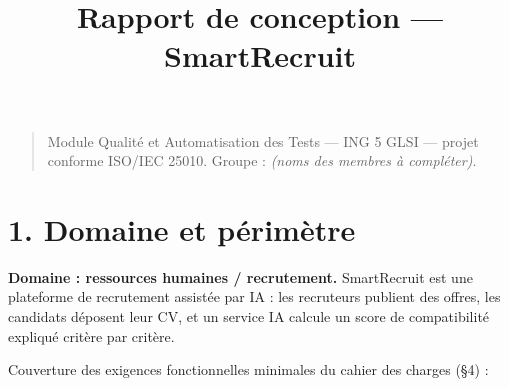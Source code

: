 \documentclass[
  11pt,
]{article}
\title{Rapport de conception --- SmartRecruit}
\author{}
\date{}
\let\tdmorigine\tableofcontents
\renewcommand{\tableofcontents}{\tdmorigine\newpage}
\begin{document}
\maketitle

\renewcommand*\contentsname{Table des matières}
{
\hypersetup{linkcolor=}
\setcounter{tocdepth}{3}
\tableofcontents
}
\begin{quote}
Module Qualité et Automatisation des Tests --- ING 5 GLSI --- projet
conforme ISO/IEC 25010. Groupe : \emph{(noms des membres à compléter)}.
\end{quote}

\section{1. Domaine et périmètre}\label{1-domaine-et-puxe9rimuxe8tre}

\textbf{Domaine : ressources humaines / recrutement.} SmartRecruit est
une plateforme de recrutement assistée par IA : les recruteurs publient
des offres, les candidats déposent leur CV, et un service IA calcule un
score de compatibilité expliqué critère par critère.

Couverture des exigences fonctionnelles minimales du cahier des charges
(§4) :
\end{document}
